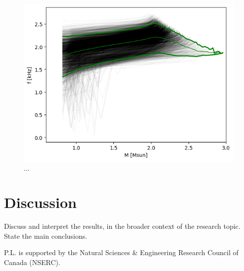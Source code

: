 \documentclass[aps,prd,twocolumn,superscriptaddress,footinbib]{revtex4-1}
\begin{document}
\begin{figure}[!h]
\includegraphics[width = \columnwidth]{fmode_psr+gw.png}
\caption{... \label{fig:fig1}}
\end{figure}

\section{Discussion}
Discuss and interpret the results, in the broader context of the research topic. State the main conclusions.

\acknowledgments
P.L. is supported by the Natural Sciences \& Engineering Research Council of Canada (NSERC).



\end{document}
